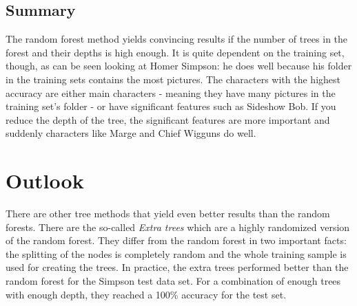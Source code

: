 \documentclass[journal, a4paper]{IEEEtran}
\begin{document}
\subsection{Summary} 
The random forest method yields convincing results if the number of trees in the forest and their depths is high enough. It is quite dependent on the training set, though, as can be seen looking at Homer Simpson: he does well because his folder in the training sets contains the most pictures. The characters with the highest accuracy are either main characters - meaning they have many pictures in the training set's folder - or have significant features such as Sideshow Bob. If you reduce the depth of the tree, the significant features are more important and suddenly characters like Marge and Chief Wigguns do well. 
\\
\section{Outlook}
There are other tree methods that yield even better results than the random forests. There are the so-called \textit{Extra trees} \cite{extratrees} which are a highly randomized version of the random forest. They differ from the random forest in two important facts: the splitting of the nodes is completely random and the whole training sample is used for creating the trees. In practice, the extra trees performed better than the random forest for the Simpson test data set. For a combination of enough trees with enough depth, they reached a 100\% accuracy for the test set.
\\
\newpage
\newpage
\appendix
\end{document}

